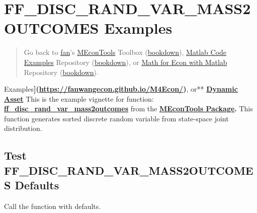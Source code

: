 \documentclass[
]{book}
\begin{document}
\hypertarget{ff_disc_rand_var_mass2outcomes-examples}{%
\section{FF\_DISC\_RAND\_VAR\_MASS2OUTCOMES Examples}\label{ff_disc_rand_var_mass2outcomes-examples}}

\begin{quote}
Go back to \href{http://fanwangecon.github.io/}{fan}'s \href{https://fanwangecon.github.io/MEconTools/}{MEconTools} Toolbox (\href{https://fanwangecon.github.io/MEconTools/bookdown}{bookdown}), \href{https://fanwangecon.github.io/M4Econ/}{Matlab Code Examples} Repository (\href{https://fanwangecon.github.io/M4Econ/bookdown}{bookdown}), or \href{https://fanwangecon.github.io/Math4Econ/}{Math for Econ with Matlab} Repository (\href{https://fanwangecon.github.io/Math4Econ/bookdown}{bookdown}).
\end{quote}

Examples\textbf{{]}(\url{https://fanwangecon.github.io/M4Econ/})}, or** \href{https://fanwangecon.github.io/CodeDynaAsset/}{\textbf{Dynamic
Asset}}
This is the example vignette for function:
\href{https://github.com/FanWangEcon/MEconTools/blob/master/MEconTools/stats/ff_disc_rand_var_mass2outcomes.m}{\textbf{ff\_disc\_rand\_var\_mass2outcomes}}
from the \href{https://fanwangecon.github.io/MEconTools/}{\textbf{MEconTools
Package}}\textbf{.} This function
generates sorted discrete random variable from state-space joint
distribution.

\hypertarget{test-ff_disc_rand_var_mass2outcomes-defaults}{%
\subsection{Test FF\_DISC\_RAND\_VAR\_MASS2OUTCOMES Defaults}\label{test-ff_disc_rand_var_mass2outcomes-defaults}}

Call the function with defaults.
\end{document}
